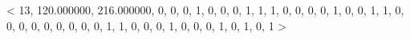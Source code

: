 < 13, 120.000000, 216.000000, 0, 0, 0, 1, 0, 0, 0, 1, 1, 1, 0, 0, 0, 0, 1, 0, 0, 1, 1, 0, 0, 0, 0, 0, 0, 0, 0, 0, 1, 1, 0, 0, 0, 1, 0, 0, 0, 1, 0, 1, 0, 1 > 


